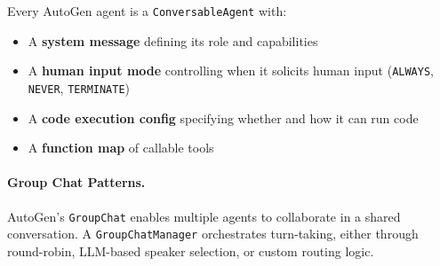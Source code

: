 Every AutoGen agent is a \texttt{ConversableAgent} with:

\begin{itemize}
  \item A \textbf{system message} defining its role and capabilities
  \item A \textbf{human input mode} controlling when it solicits human input (\texttt{ALWAYS}, \texttt{NEVER}, \texttt{TERMINATE})
  \item A \textbf{code execution config} specifying whether and how it can run code
  \item A \textbf{function map} of callable tools
\end{itemize}

\paragraph{Group Chat Patterns.}
\label{group-chat-patterns.}

AutoGen’s \texttt{GroupChat} enables multiple agents to collaborate in a shared conversation. A \texttt{GroupChatManager} orchestrates turn-taking, either through round-robin, LLM-based speaker selection, or custom routing logic.

